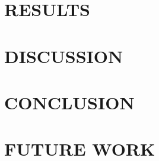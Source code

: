 \documentclass[10pt, twocolumn, letterpaper]{article}
\begin{document}
\section{RESULTS}


\section{DISCUSSION}


\section{CONCLUSION}


\section{FUTURE WORK}



\end{document}
